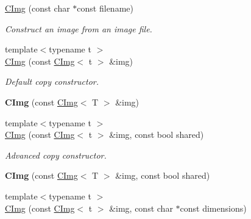 \begin{DoxyCompactItemize}
\item 
\hyperlink{structcimg__library_1_1CImg_aade5358c8a81825b86e6c654194b33d2}{CImg} (const char $\ast$const filename)
\begin{DoxyCompactList}\small\item\em Construct an image from an image file. \item\end{DoxyCompactList}\item 
{\footnotesize template$<$typename t $>$ }\\\hyperlink{structcimg__library_1_1CImg_a8479cd0cf615e3131efcabac1e3ff004}{CImg} (const \hyperlink{structcimg__library_1_1CImg}{CImg}$<$ t $>$ \&img)
\begin{DoxyCompactList}\small\item\em Default copy constructor. \item\end{DoxyCompactList}\item 
\hypertarget{structcimg__library_1_1CImg_aae1d70bef944e9263b73d0d318b42d7f}{
{\bfseries CImg} (const \hyperlink{structcimg__library_1_1CImg}{CImg}$<$ T $>$ \&img)}
\label{structcimg__library_1_1CImg_aae1d70bef944e9263b73d0d318b42d7f}

\item 
{\footnotesize template$<$typename t $>$ }\\\hyperlink{structcimg__library_1_1CImg_a8dfaf8ddcc86f17442f8eeb3102d0662}{CImg} (const \hyperlink{structcimg__library_1_1CImg}{CImg}$<$ t $>$ \&img, const bool shared)
\begin{DoxyCompactList}\small\item\em Advanced copy constructor. \item\end{DoxyCompactList}\item 
\hypertarget{structcimg__library_1_1CImg_aaecfca2842e450a766dd71a220a1b9a6}{
{\bfseries CImg} (const \hyperlink{structcimg__library_1_1CImg}{CImg}$<$ T $>$ \&img, const bool shared)}
\label{structcimg__library_1_1CImg_aaecfca2842e450a766dd71a220a1b9a6}

\item 
\hypertarget{structcimg__library_1_1CImg_af31fbb19630af0ddbee182d31e41093c}{
{\footnotesize template$<$typename t $>$ }\\\hyperlink{structcimg__library_1_1CImg_af31fbb19630af0ddbee182d31e41093c}{CImg} (const \hyperlink{structcimg__library_1_1CImg}{CImg}$<$ t $>$ \&img, const char $\ast$const dimensions)}
\label{structcimg__library_1_1CImg_af31fbb19630af0ddbee182d31e41093c}


\end{DoxyCompactItemize}
